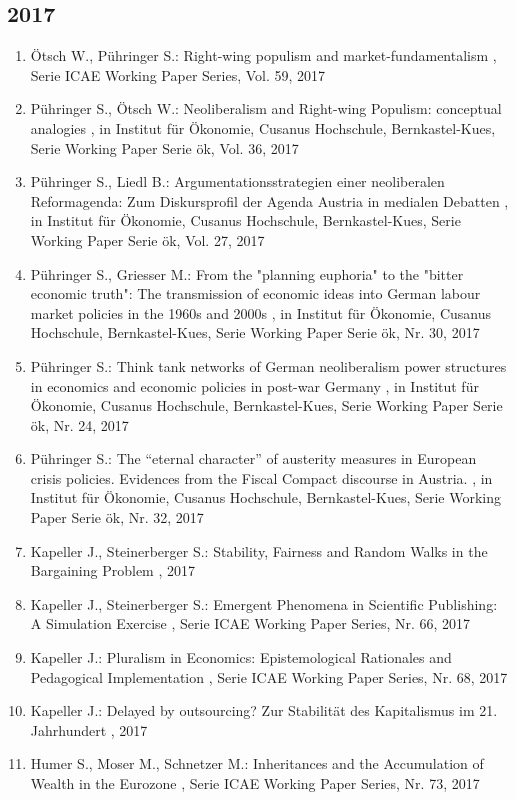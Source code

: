  \subsection*{2017} 
 \begin{enumerate}[leftmargin=*, labelsep=0.5cm] 
	 \item Ötsch W., Pühringer S.:  Right-wing populism and market-fundamentalism  , Serie ICAE Working Paper Series, Vol. 59, 2017
	 \item Pühringer S., Ötsch W.:  Neoliberalism and Right-wing Populism: conceptual analogies  , in Institut für Ökonomie, Cusanus Hochschule, Bernkastel-Kues, Serie Working Paper Serie ök, Vol. 36, 2017
	 \item Pühringer S., Liedl B.:  Argumentationsstrategien einer neoliberalen Reformagenda: Zum Diskursprofil der Agenda Austria in medialen Debatten  , in Institut für Ökonomie, Cusanus Hochschule, Bernkastel-Kues, Serie Working Paper Serie ök, Vol. 27, 2017
	 \item Pühringer S., Griesser M.:  From the "planning euphoria" to the "bitter economic truth": The transmission of economic ideas into German labour market policies in the 1960s and 2000s  , in Institut für Ökonomie, Cusanus Hochschule, Bernkastel-Kues, Serie Working Paper Serie ök, Nr. 30, 2017
	 \item Pühringer S.:  Think tank networks of German neoliberalism power structures in economics and economic policies in post-war Germany  , in Institut für Ökonomie, Cusanus Hochschule, Bernkastel-Kues, Serie Working Paper Serie ök, Nr. 24, 2017
	 \item Pühringer S.:  The “eternal character” of austerity measures in European crisis policies. Evidences from the Fiscal Compact discourse in Austria.  , in Institut für Ökonomie, Cusanus Hochschule, Bernkastel-Kues, Serie Working Paper Serie ök, Nr. 32, 2017
	 \item Kapeller J., Steinerberger S.:  Stability, Fairness and Random Walks in the Bargaining Problem  , 2017
	 \item Kapeller J., Steinerberger S.:  Emergent Phenomena in Scientific Publishing: A Simulation Exercise  , Serie ICAE Working Paper Series, Nr. 66, 2017
	 \item Kapeller J.:  Pluralism in Economics: Epistemological Rationales and Pedagogical Implementation  , Serie ICAE Working Paper Series, Nr. 68, 2017
	 \item Kapeller J.:  Delayed by outsourcing? Zur Stabilität des Kapitalismus im 21. Jahrhundert  , 2017
	 \item Humer S., Moser M., Schnetzer M.:  Inheritances and the Accumulation of Wealth in the Eurozone  , Serie ICAE Working Paper Series, Nr. 73, 2017

\end{enumerate}
